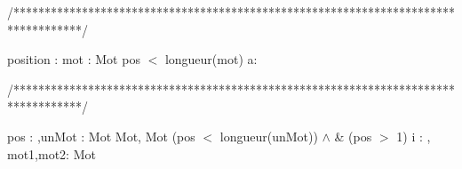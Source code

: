 /***********************************************************************************/
\begin{algorithme}%
      {position : \entier}%
      {mot : Mot}%
      {pos $<$ longueur(mot)}%
      {a: \caractere }%
      {
         
      }
\end{algorithme}

/***********************************************************************************/
\begin{algorithme}
         {pos : \entier,unMot : Mot}%
         {Mot, Mot}%
         {(pos $<$ longueur(unMot)) $\land$ \& (pos $>$ 1)}%
         {i : \entier, mot1,mot2: Mot}%
         {
                {
                }
                {
                }
          }
\end{algorithme}
